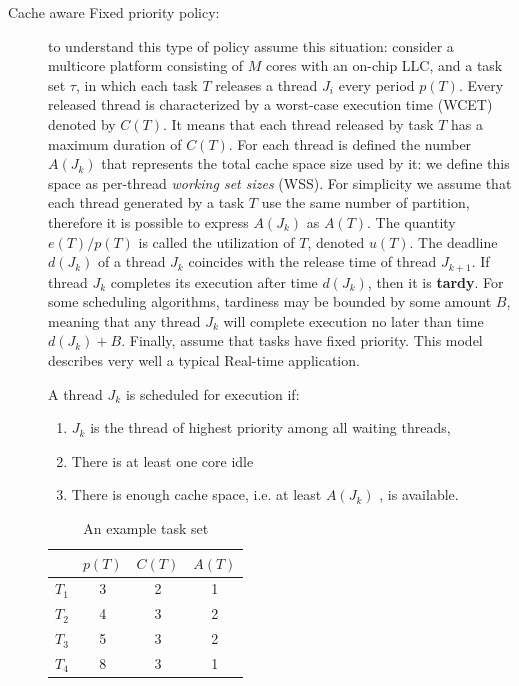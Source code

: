 \begin{description}
\item[Cache aware Fixed priority policy:] to understand this type of policy assume this situation: consider a multicore platform consisting of $M$ cores 
with an on-chip LLC, and a task set $\tau$, in which each task $T$ releases a thread $J_i$ every period $p(T)$. Every released thread is characterized by a 
worst-case execution time (WCET) denoted by $C(T)$. It means that each thread released by task $T$ has a maximum duration of $C(T)$. For each thread is 
defined the number $A(J_k)$ that represents the total cache space size used by it: we define this space as per-thread \textit{working set sizes} (WSS). 
For simplicity we assume that each thread generated by a task $T$ use the same number of partition, therefore it is possible to express $A(J_k)$ as $A(T)$. 
The quantity $e(T)/p(T)$ is called the utilization of $T$, denoted $u(T)$. The deadline $d(J_k)$ of a thread $J_k$ coincides with the release time of thread 
$J_{k+1}$. If thread $J_k$ completes its execution after time $d(J_k)$, then it is \textbf{tardy}. For some scheduling algorithms, tardiness may be bounded 
by some amount $B$, meaning that any thread $J_k$ will complete execution no later than time $d(J_k)+B$. Finally, assume that tasks have fixed priority.
This model describes very well a typical Real-time application.

A thread $J_k$ is scheduled for execution if:

\begin{enumerate}
	\item $J_k$ is the thread of highest priority among all waiting threads,
	\item There is at least one core idle
	\item There is enough cache space, i.e. at least $A(J_k)$ , is available.
\end{enumerate}

\begin{table}[htbp]
\begin{center}
\begin{tabular}{l|c|c|c}
	\hline
	& $p(T)$ & $C(T)$ & $A(T)$ \\ \hline
	$T_1$ & 3 & 2 & 1 \\ \hline
	$T_2$ & 4 & 3 & 2 \\ \hline
	$T_3$ & 5 & 3 & 2 \\ \hline
	$T_4$ & 8 & 3 & 1 \\ 
	\hline
\end{tabular}
\caption{An example task set}
\label{tab:cache_task_set}
\end{center}
\end{table}


\end{description}
